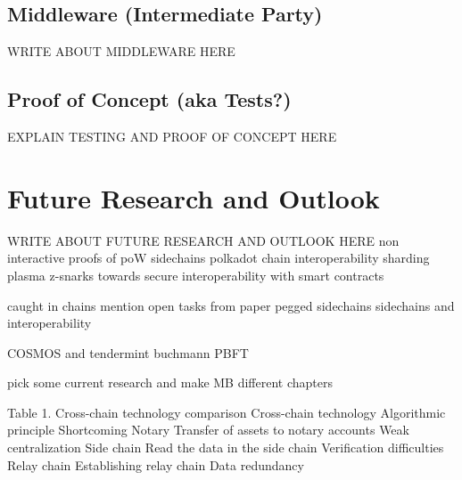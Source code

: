 \section{Middleware (Intermediate Party)}
\label{sec:chapter05:middleware}
WRITE ABOUT MIDDLEWARE HERE

\section{Proof of Concept (aka Tests?)}
\label{sec:chapter05:poc}
EXPLAIN TESTING AND PROOF OF CONCEPT HERE

\chapter{Future Research and Outlook}
\label{ch:chapter06}
WRITE ABOUT FUTURE RESEARCH AND OUTLOOK HERE
non interactive proofs of poW \cite{kiayias2017non} sidechains \cite{kiayias2019proof} polkadot \cite{wood2016polkadot}  chain interoperability \cite{buterin2016chain} sharding \cite{buterin2017sharding} plasma \cite{poon2017plasma} z-snarks \cite{garoffolo2020zendoo} towards secure interoperability with smart contracts \cite{dagher2017towards}

caught in chains mention open tasks from paper \cite{borkowski2018caught}
pegged sidechains \cite{back2014enabling}
sidechains and interoperability \cite{johnson2019sidechains}


COSMOS \cite{kwon2018network} and tendermint \cite{kwon2014tendermint} buchmann \cite{buchman2016tendermint} PBFT \cite{castro1999practical}

pick some current research and make MB different chapters

Table 1. Cross-chain technology comparison
Cross-chain technology Algorithmic principle Shortcoming
Notary Transfer of assets to notary accounts Weak centralization
Side chain Read the data in the side chain Verification difficulties
Relay chain Establishing relay chain Data redundancy

